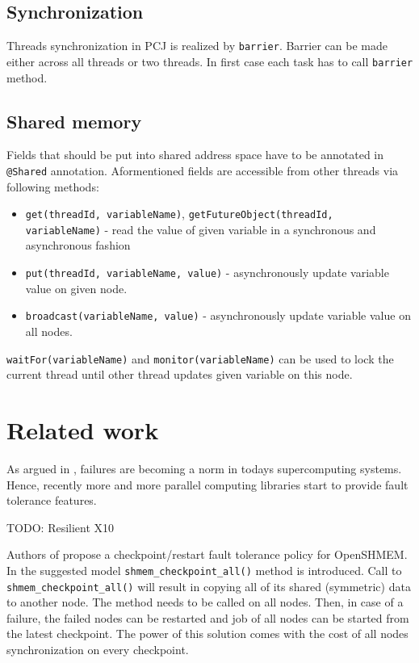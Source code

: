 \documentclass{llncs}
\newcommand{\inlinecode}{\texttt}
\begin{document}
\subsection{Synchronization}
Threads synchronization in PCJ is realized by \inlinecode{barrier}.
Barrier can be made either across all threads or two threads.
In first case each task has to call \inlinecode{barrier} method.
\subsection{Shared memory}
Fields that should be put into shared address space have to be annotated in \inlinecode{@Shared} annotation.
Aformentioned fields are accessible from other threads via following methods:
\begin{itemize}
\item\inlinecode{get(threadId, variableName)}, \inlinecode{getFutureObject(threadId, variableName)} - read the value of given variable
in a synchronous and asynchronous fashion
\item\inlinecode{put(threadId, variableName, value)} - asynchronously update variable value on given node.
\item\inlinecode{broadcast(variableName, value)} - asynchronously update variable value on all nodes.
\end{itemize}
\inlinecode{waitFor(variableName)} and \inlinecode{monitor(variableName)} can be used to lock the current thread until other thread updates given variable on this node.

\section{Related work}
As argued in \cite{shmem}, failures are becoming a norm in todays supercomputing systems.
Hence, recently more and more parallel computing libraries start to provide fault tolerance features.

TODO: Resilient X10

Authors of \cite{shmem} propose a checkpoint/restart fault tolerance policy for OpenSHMEM.
In the suggested model \inlinecode{shmem\_checkpoint\_all()} method is introduced.
Call to \inlinecode{shmem\_checkpoint\_all()} will result in copying all of its shared (symmetric) data to another node.
The method needs to be called on all nodes.
Then, in case of a failure, the failed nodes can be restarted and job of all nodes can be started from the latest checkpoint.
The power of this solution comes with the cost of all nodes synchronization on every checkpoint.
\end{document}
